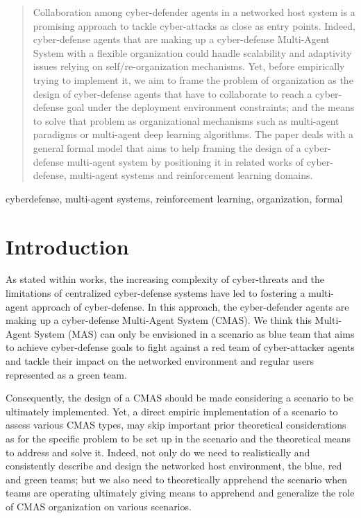 \documentclass[conference]{IEEEtran}
\begin{document}
\maketitle

\begin{abstract}
 
Collaboration among cyber-defender agents in a networked host system is a promising approach to tackle cyber-attacks as close as entry points. Indeed, cyber-defense agents that are making up a cyber-defense Multi-Agent System with a flexible organization could handle scalability and adaptivity issues relying on self/re-organization mechanisms. Yet, before empirically trying to implement it, we aim to frame the problem of organization as the design of cyber-defense agents that have to collaborate to reach a cyber-defense goal under the deployment environment constraints; and the means to solve that problem as organizational mechanisms such as multi-agent paradigms or multi-agent deep learning algorithms.
The paper deals with a general formal model that aims to help framing the design of a cyber-defense multi-agent system by positioning it in related works of cyber-defense, multi-agent systems and reinforcement learning domains.

\end{abstract}

\begin{IEEEkeywords}
cyberdefense, multi-agent systems, reinforcement learning, organization, formal
\end{IEEEkeywords}

\section{Introduction}

As stated within  works\cite{kott2023autonomous}, the increasing complexity of cyber-threats and the limitations of centralized cyber-defense systems have led to fostering a multi-agent approach of cyber-defense. In this approach, the cyber-defender agents are making up a cyber-defense Multi-Agent System (CMAS). We think this Multi-Agent System (MAS) can only be envisioned in a scenario as blue team that aims to achieve cyber-defense goals to fight against a red team of cyber-attacker agents and tackle their impact on the networked environment and regular users represented as a green team.

Consequently, the design of a CMAS should be made considering a scenario to be ultimately implemented. Yet, a direct empiric implementation of a scenario to assess various CMAS types, may skip important prior theoretical considerations as for the specific problem to be set up in the scenario and the theoretical means to address and solve it. Indeed, not only do we need to realistically and consistently describe and design the networked host environment, the blue, red and green teams; but we also need to theoretically apprehend the scenario when teams are operating ultimately giving means to apprehend and generalize the role of CMAS organization on various scenarios.
\end{document}
